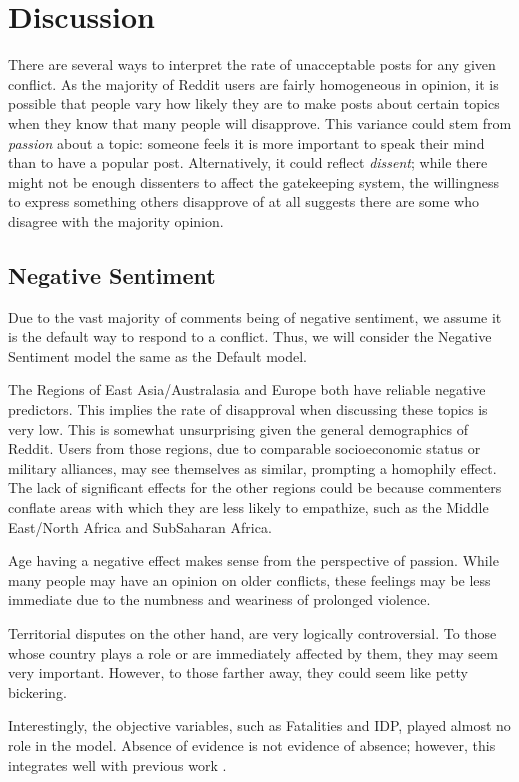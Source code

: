 \section{Discussion}
There are several ways to interpret the rate of unacceptable posts for any given conflict. As the majority of Reddit users are fairly homogeneous in opinion, it is possible that people vary how likely they are to make posts about certain topics when they know that many people will disapprove. This variance could stem from \textit{passion} about a topic: someone feels it is more important to speak their mind than to have a popular post. Alternatively, it could reflect \textit{dissent}; while there might not be enough dissenters to affect the gatekeeping system, the willingness to express something others disapprove of at all suggests there are some who disagree with the majority opinion. 

\subsection{Negative Sentiment}
Due to the vast majority of comments being of negative sentiment, we assume it is the default way to respond to a conflict. Thus, we will consider the Negative Sentiment model the same as the Default model.

The Regions of East Asia/Australasia and Europe both have reliable negative predictors. This implies the rate of disapproval when discussing these topics is very low. This is somewhat unsurprising given the general demographics of Reddit. Users from those regions, due to comparable socioeconomic status or military alliances, may see themselves as similar, prompting a homophily effect. The lack of significant effects for the other regions could be because commenters conflate areas with which they are less likely to empathize, such as the Middle East/North Africa and SubSaharan Africa.

Age having a negative effect makes sense from the perspective of passion. While many people may have an opinion on older conflicts, these feelings may be less immediate due to the numbness and weariness of prolonged violence.

Territorial disputes on the other hand, are very logically controversial. To those whose country plays a role or are immediately affected by them, they may seem very important. However, to those farther away, they could seem like petty bickering.

Interestingly, the objective variables, such as Fatalities and IDP, played almost no role in the model. Absence of evidence is not evidence of absence; however, this integrates well with previous work \cite{Berinsky2009}.

